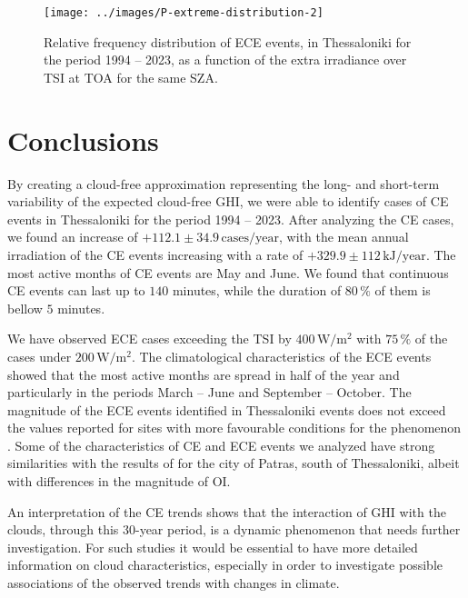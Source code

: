 \documentclass[preprint, 5p,
authoryear]{elsarticle} %
\begin{document}
\begin{figure}

{\centering \texttt{[image: ../images/P-extreme-distribution-2]} 

}

\caption{Relative frequency distribution of ECE events, in Thessaloniki for the period 1994 -- 2023, as a function of the extra irradiance over TSI at TOA for the same SZA.}\label{fig:P-extreme-distribution}
\end{figure}

\hypertarget{conclusions}{%
\section{Conclusions}\label{conclusions}}

By creating a cloud-free approximation representing the long- and
short-term variability of the expected cloud-free GHI, we were able to
identify cases of CE events in Thessaloniki for the period 1994 -- 2023.
After analyzing the CE cases, we found an increase of
\(+112.1\pm 34.9\,\text{cases}/\text{year}\), with the mean annual
irradiation of the CE events increasing with a rate of
\(+329.9\pm 112\,\text{kJ}/\text{year}\). The most active months of CE
events are May and June. We found that continuous CE events can last up
to \(140\) minutes, while the duration of \(80\,\%\) of them is bellow
\(5\) minutes.

We have observed ECE cases exceeding the TSI by
\(400\,\text{W}/\text{m}^{2}\) with \(75\,\%\) of the cases under
\(200\,\text{W}/\text{m}^{2}\). The climatological characteristics of
the ECE events showed that the most active months are spread in half of
the year and particularly in the periods March -- June and September --
October. The magnitude of the ECE events identified in Thessaloniki
events does not exceed the values reported for sites with more
favourable conditions for the phenomenon \citep[e.g.,][]{Cordero2023}.
Some of the characteristics of CE and ECE events we analyzed have strong
similarities with the results of \citet{Vamvakas2020} for the city of
Patras, south of Thessaloniki, albeit with differences in the magnitude
of OI.

An interpretation of the CE trends shows that the interaction of GHI
with the clouds, through this 30-year period, is a dynamic phenomenon
that needs further investigation. For such studies it would be essential
to have more detailed information on cloud characteristics, especially
in order to investigate possible associations of the observed trends
with changes in climate.


\end{document}
